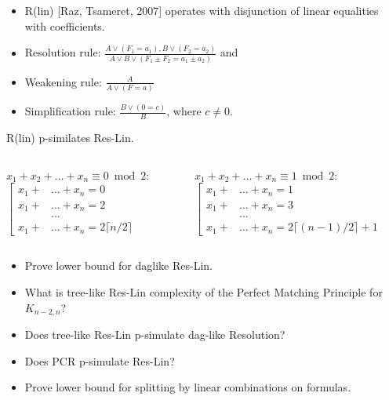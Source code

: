 {
\begin{itemize}
\item R(lin) [Raz, Tsameret, 2007] operates with disjunction of linear equalities with  coefficients.
\item Resolution rule: $\frac{A\lor (F_1=a_1), B\lor (F_2=a_2)}{A \lor B \lor (F_1 \pm F_2=a_1\pm a_2)}$ and
\item Weakening rule: $\frac{A}{A\lor (F=a)}$
\item Simplification rule:  $\frac{B\lor (0=c)}{B}$, where $c\neq 0$.
\end{itemize}

\pause \myth R(lin) p-similates Res-Lin.
\medskip

\pause
\begin{columns}
\begin{column}{5cm}
$x_1+x_2+\dots+x_n\equiv 0 \bmod 2$:
$\left[\begin{aligned} x_1+&\dots+x_n=0\\ x_1+&\dots+x_n = 2 \\ &\dots \\ x_1+&\dots+x_n = 2\lceil n/2\rceil \end{aligned}\right.$
\end{column}
\begin{column}{5cm}
$x_1+x_2+\dots+x_n\equiv 1 \bmod 2$:
$\left[\begin{aligned} x_1+&\dots+x_n=1\\ x_1+&\dots+x_n = 3 \\ &\dots \\ x_1+&\dots+x_n = 2\lceil (n-1)/2\rceil+1 \end{aligned}\right.$
\end{column}
\end{columns}

}

{
\begin{itemize}
\item Prove lower bound for daglike Res-Lin.
\item What is tree-like Res-Lin complexity of the Perfect Matching Principle for $K_{n-2,n}$?
\item Does tree-like Res-Lin p-simulate dag-like Resolution?
\item Does PCR p-simulate Res-Lin?
\item Prove lower bound for splitting by linear combinations on  formulas.
\end{itemize}
}




